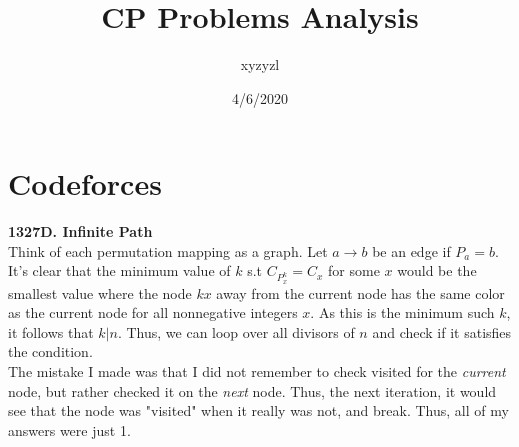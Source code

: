 \documentclass{article}
\title{CP Problems Analysis}
\author{xyzyzl}
\date{4/6/2020}
\begin{document}
\maketitle

\section{Codeforces}
\textbf{1327D. Infinite Path}\\
Think of each permutation mapping as a graph. Let $a \rightarrow b$ be an edge if $P_a=b$. It's clear that the minimum value of $k$ s.t $C_{P^k_x} = C_x$ for some $x$ would be the smallest value where the node $kx$ away from the current node has the same color as the current node for all nonnegative integers $x$. As this is the minimum such $k$, it follows that $k | n$. Thus, we can loop over all divisors of $n$ and check if it satisfies the condition. \\
The mistake I made was that I did not remember to check visited for the \textit{current} node, but rather checked it on the \textit{next} node. Thus, the next iteration, it would see that the node was "visited" when it really was not, and break. Thus, all of my answers were just 1.
\end{document}
